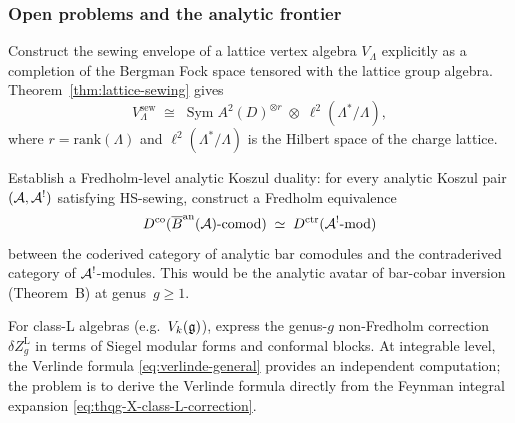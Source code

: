 \subsubsection{Open problems and the analytic frontier}

\begin{openproblem}%
\label{prob:thqg-X-lattice-sewing}%
%
Construct the sewing envelope of a lattice vertex algebra
$V_\Lambda$ explicitly as a completion of the Bergman Fock
space tensored with the lattice group algebra.
Theorem~\textup{\ref{thm:lattice-sewing}} gives
\begin{equation}\label{eq:thqg-X-lattice-sewing-conj}
V_\Lambda^{\mathrm{sew}}
\;\cong\;
\operatorname{Sym} A^2(D)^{\otimes r}
\;\otimes\;
\ell^2(\Lambda^*/\Lambda),
\end{equation}
where $r = \mathrm{rank}(\Lambda)$ and
$\ell^2(\Lambda^*/\Lambda)$ is the Hilbert space of the
charge lattice.
\end{openproblem}

\begin{openproblem}%
\label{prob:thqg-X-boundary-bar}%
%
Establish a Fredholm-level analytic Koszul duality:
for every analytic Koszul pair $(\mathcal{A}, \mathcal{A}^!)$ satisfying
HS-sewing, construct a Fredholm equivalence
\begin{equation}\label{eq:thqg-X-boundary-bar-conj}
D^{\mathrm{co}}(\overline{B}^{\mathrm{an}}(\mathcal{A})\text{-comod})
\;\simeq\;
D^{\mathrm{ctr}}(\mathcal{A}^!\text{-mod})
\end{equation}
between the coderived category of analytic bar comodules and
the contraderived category of $\mathcal{A}^!$-modules.
This would be the analytic avatar of bar-cobar inversion
(Theorem~B) at genus~$g \geq 1$.
\end{openproblem}

\begin{openproblem}%
\label{prob:thqg-X-non-fredholm-closed}%
%
For class-L algebras (e.g.\ $V_k(\mathfrak{g})$), express the
genus-$g$ non-Fredholm correction $\delta Z_g^{\mathrm{L}}$
in terms of Siegel modular forms and conformal blocks.
At integrable level, the Verlinde formula
\eqref{eq:verlinde-general} provides an independent
computation; the problem is to derive the Verlinde formula
directly from the Feynman integral expansion
\eqref{eq:thqg-X-class-L-correction}.
\end{openproblem}

